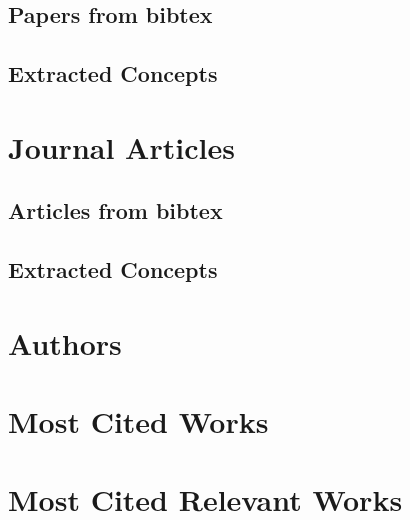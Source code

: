 \documentclass[a4paper]{article}
\begin{document}
\clearpage
\subsection{Papers from bibtex}


\clearpage
\subsection{Extracted Concepts}


%

\clearpage
\section{Journal Articles}

\clearpage
\subsection{Articles from bibtex}



\clearpage
\subsection{Extracted Concepts}


%

\clearpage
\section{Authors}



\clearpage
\section{Most Cited Works}



\clearpage
\section{Most Cited Relevant Works}
\end{document}
